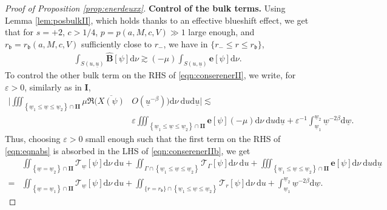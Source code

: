 \documentclass[reqno]{amsart}
\numberwithin{equation}{section}
\newcommand{\intS}{\int_{S(u,\ubar)}}
\newcommand{\Real}{\mathfrak{R}}
\newcommand{\wbar}{\underline{w}}
\newcommand{\ubar}{{\underline{u}}}
\newcommand{\dee}{\mathrm{d}}
\newcommand{\ener}{\mathbf{e}}
\newcommand{\un}{\mathbf{I}}
\newcommand{\rb}{r_\mathfrak{b}}
\theoremstyle{plain}
\theoremstyle{definition}
\theoremstyle{remark}
\numberwithin{equation}{section}
\begin{document}
\begin{proof}[Proof of Proposition \ref{prop:enerdeuxx}]
\noindent\textbf{Control of the bulk terms.} Using Lemma \ref{lem:posbulkII}, which holds thanks to an effective blueshift effect, we get that for $s=+2$, $c>1/4$, $p=p(a,M,c,V)\gg 1$ large enough, and $\rb=\rb(a,M,c,V)$ sufficiently close to $r_-$, we have in $\{r_-\leq r\leq\rb\}$,
    \begin{align}\label{eqn:bulkIIpos2}
    \intS\widehat{\mathbf{B}}[\psi]\dee\nu\gtrsim(-\mu)\intS{\ener}[\psi]\dee\nu.
\end{align}
To control the other bulk term on the RHS of \eqref{eqn:conserenerII}, we write, for $\varepsilon>0$, similarly as in $\un$,
\begin{align}
    \Bigg|\iiint_{\left\{\wbar_1 \leq \wbar\leq \wbar_2\right\} \cap \mathbf{II}}\mu\Real(\overline{X(\psi)}&O(\ubar^{-\beta}))\dee\nu\:\dee u\dee\ubar\Bigg|\lesssim\nonumber\\
    &\varepsilon \iiint_{\left\{\wbar_1 \leq \wbar\leq \wbar_2\right\} \cap \mathbf{II}}\ener[\psi](-\mu)\dee\nu\:\dee u\dee\ubar+\varepsilon^{-1}\int_{\wbar_1}^{\wbar_2}\wbar^{-2\beta}\dee\wbar.\label{eqn:eqnabs}
\end{align}
Thus, choosing $\varepsilon>0$ small enough such that the first term on the RHS of \eqref{eqn:eqnabs} is absorbed in the LHS of \eqref{eqn:conserenerIIb}, we get 
\begin{align}
& \iint_{\left\{\wbar=\wbar_2\right\} \cap \mathbf{II}} \mathcal{T}_{\wbar}[\psi] \dee\nu \mathrm{~d} u+\iint_{\Gamma\cap\left\{\wbar_1 \leq \wbar\leq \wbar_2\right\}} \mathcal{T}_\Gamma[\psi] \dee\nu \mathrm{~d}  u+\iiint_{\left\{\wbar_1 \leq \wbar\leq \wbar_2\right\} \cap \mathbf{II}} \ener[\psi] \dee\nu\:\dee u\dee\ubar \nonumber\\
= & \iint_{\left\{\wbar=\wbar_1\right\} \cap \mathbf{II}} \mathcal{T}_{\wbar}[\psi] \dee\nu \mathrm{~d} u+\iint_{\{r=r_{\mathfrak{b}}\}  \cap\left\{\wbar_1 \leq \wbar \leq \wbar_2\right\}} \mathcal{T}_r[\psi] \dee\nu \mathrm{~d}  u+\int_{\wbar_1}^{\wbar_2}\wbar^{-2\beta}\dee\wbar.\label{eqn:conserenerIIb}
\end{align}
 
 
 

\end{proof}
\end{document}
